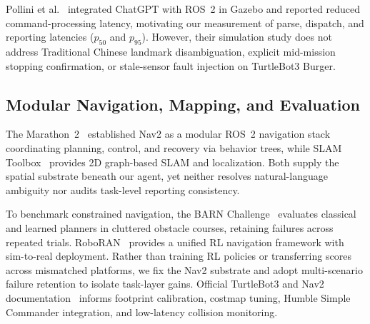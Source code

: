 \documentclass[conference,a4paper]{IEEEtran}
\begin{document}
Pollini et al.~\cite{b3} integrated ChatGPT with ROS~2 in Gazebo and reported reduced command-processing latency, motivating our measurement of parse, dispatch, and reporting latencies ($p_{50}$ and $p_{95}$). However, their simulation study does not address Traditional Chinese landmark disambiguation, explicit mid-mission stopping confirmation, or stale-sensor fault injection on TurtleBot3 Burger.

\subsection{Modular Navigation, Mapping, and Evaluation}

The Marathon~2~\cite{b4} established Nav2 as a modular ROS~2 navigation stack coordinating planning, control, and recovery via behavior trees, while SLAM Toolbox~\cite{b5} provides 2D graph-based SLAM and localization. Both supply the spatial substrate beneath our agent, yet neither resolves natural-language ambiguity nor audits task-level reporting consistency.

To benchmark constrained navigation, the BARN Challenge~\cite{b6, b12} evaluates classical and learned planners in cluttered obstacle courses, retaining failures across repeated trials. RoboRAN~\cite{b7} provides a unified RL navigation framework with sim-to-real deployment. Rather than training RL policies or transferring scores across mismatched platforms, we fix the Nav2 substrate and adopt multi-scenario failure retention to isolate task-layer gains. Official TurtleBot3 and Nav2 documentation~\cite{b8, b9, b10, b11} informs footprint calibration, costmap tuning, Humble Simple Commander integration, and low-latency collision monitoring.
\end{document}
